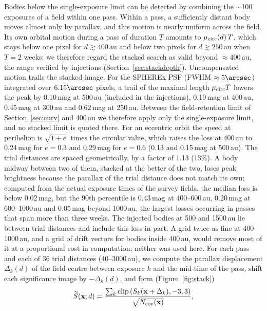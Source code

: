 \documentclass[twocolumn,linenumbers]{aastex702}
\begin{document}
Bodies below the single-exposure limit can be detected by combining the $\sim$100 exposures of a field within one pass. Within a pass, a sufficiently distant body moves almost only by parallax, and this motion is nearly uniform across the field. Its own orbital motion during a pass of duration $T$ amounts to $\mu_{\rm circ}(d)\,T$, which stays below one pixel for $d \gtrsim 400$\,au and below two pixels for $d \gtrsim 250$\,au when $T = 2$ weeks; we therefore regard the stacked search as valid beyond $\approx 400$\,au, the range verified by injections (Section~\ref{sec:stackdepth}). Uncompensated motion trails the stacked image. For the SPHEREx PSF (FWHM $\approx 5\arcsec$) integrated over $6.15\arcsec$ pixels, a trail of the maximal length $\mu_{\rm circ}T$ lowers the peak by 0.10\,mag at 500\,au (included in the injections), 0.19\,mag at 400\,au, 0.45\,mag at 300\,au and 0.62\,mag at 250\,au. Between the field-retention limit of Section~\ref{sec:curv} and 400\,au we therefore apply only the single-exposure limit, and no stacked limit is quoted there. For an eccentric orbit the speed at perihelion is $\sqrt{1+e}$ times the circular value, which raises the loss at 400\,au to 0.24\,mag for $e = 0.3$ and 0.29\,mag for $e = 0.6$ (0.13 and 0.15\,mag at 500\,au). The trial distances are spaced geometrically, by a factor of 1.13 (13\%). A body midway between two of them, stacked at the better of the two, loses peak brightness because the parallax of the trial distance does not match its own; computed from the actual exposure times of the survey fields, the median loss is below 0.02\,mag, but the 90th percentile is 0.43\,mag at 400--600\,au, 0.20\,mag at 600--1000\,au and 0.05\,mag beyond 1000\,au, the largest losses occurring in passes that span more than three weeks. The injected bodies at 500 and 1500\,au lie between trial distances and include this loss in part. A grid twice as fine at 400--1000\,au, and a grid of drift vectors for bodies inside 400\,au, would remove most of it at a proportional cost in computation; neither was used here. For each pass and each of 36 trial distances (40--3000\,au), we compute the parallax displacement $\Delta_k(d)$ of the field centre between exposure $k$ and the mid-time of the pass, shift each significance image by $-\Delta_k(d)$, and form (Figure~\ref{fig:stack})
\begin{equation}
\widetilde{S}(\mathbf{x}; d) = \frac{\sum_k \mathrm{clip}\left(S_k(\mathbf{x} + \Delta_k), -3, 3\right)}{\sqrt{N_{\rm cov}(\mathbf{x})}},
\end{equation}
\end{document}
